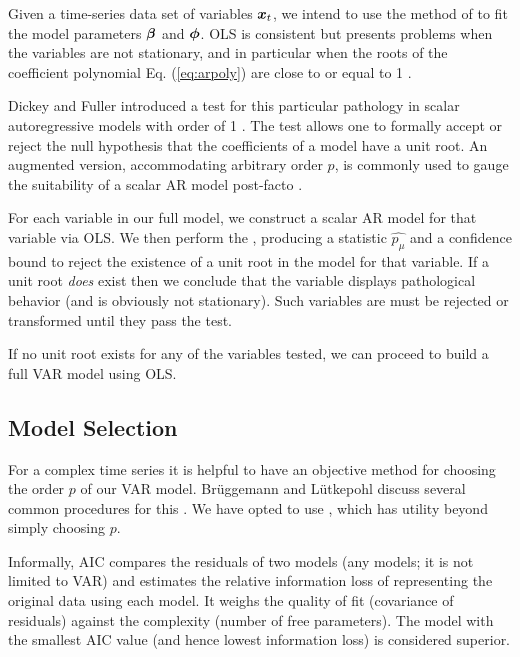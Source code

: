     Given a time-series data set of variables $\boldsymbol{x}_t$, we intend 
    to use the method of  to fit the model parameters
    $\boldsymbol{\beta}$ and $\boldsymbol{\phi}$.  OLS is consistent but presents problems when
    the variables are not stationary, and in particular when the roots of the 
    coefficient polynomial Eq. (\ref{eq:arpoly}) are close to or equal to 1 \cite{dickey}.
    
    Dickey and Fuller introduced a test for this particular pathology in 
    scalar autoregressive models with order of 1 \cite{dickey}. The test allows 
    one to formally accept or reject the null hypothesis that the coefficients 
    of a model have a unit root. An augmented version, accommodating arbitrary 
    order $p$, is commonly used to gauge the suitability of a scalar AR model 
    post-facto \cite{juselius}.  
    
    For each variable in our full model, we construct a scalar AR model for that
    variable via OLS.  We then perform the , 
    producing a statistic $\hat{p_\mu}$ and a confidence bound to reject 
    the existence of a unit root in the model for that variable.
    If a unit root \emph{does} exist then we conclude that the
    variable displays pathological behavior (and is obviously not stationary).
    Such variables are must be rejected or transformed until they pass the test.
    
    If no unit root exists for any of the variables tested, we can proceed to build
    a full VAR model using OLS.

\subsection{Model Selection} \label{sec:modelorder}

    For a complex time series it is helpful to have an objective method
    for choosing the order $p$ of our VAR model.  Brüggemann and Lütkepohl 
    discuss several common procedures for this \cite{briiggemann}. We have 
    opted to use , which has utility 
    beyond simply choosing $p$.  
    
    Informally, AIC compares the residuals of two models (any models; it is not 
    limited to VAR) and estimates the relative information loss of representing 
    the original data using each model.  It weighs the quality of fit 
    (covariance of residuals) against the complexity (number of free 
    parameters). The model with the  smallest AIC value (and hence lowest 
    information loss) is considered superior.

